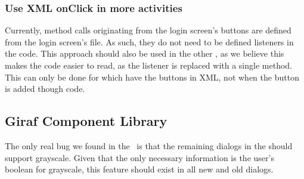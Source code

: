 \subsubsection{Use XML onClick in more activities}
Currently, method calls originating from the login screen's buttons are defined
from the login screen's  file. As such, they do not need to be defined
listeners in the code. This approach should also be used in the other
, as we believe this makes the code easier to read, as the
listener is replaced with a single method. This can only be done for
 which have the buttons in XML, not when the button is added
though code.

\subsection{Giraf Component Library}
The only real bug we found in the \clib\ is that the remaining dialogs in
the  should support grayscale. Given that the only
necessary information is the user's boolean for grayscale, this feature should
exist in all new and old dialogs.

